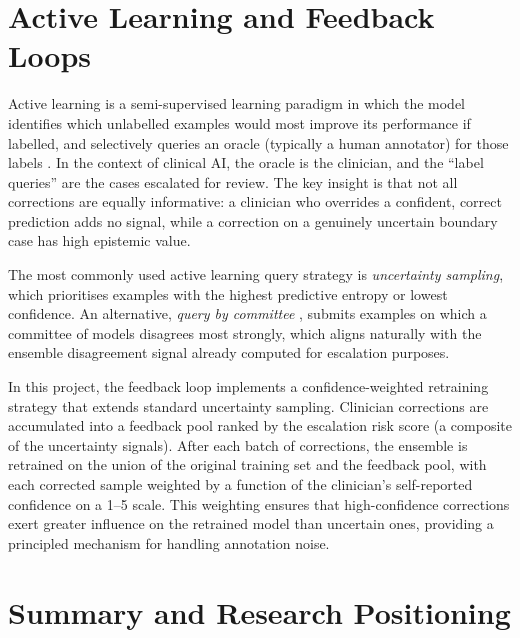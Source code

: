 \documentclass[12pt, a4paper]{report}
\begin{document}
  \section{Active Learning and Feedback Loops}
  \label{sec:active-learning}

  Active learning is a semi-supervised learning paradigm in which the model identifies
  which unlabelled examples would most improve its performance if labelled, and
  selectively queries an oracle (typically a human annotator) for those labels
  \citep{settles2009active}. In the context of clinical AI, the oracle is the
  clinician, and the ``label queries'' are the cases escalated for review. The key
  insight is that not all corrections are equally informative: a clinician who
  overrides a confident, correct prediction adds no signal, while a correction on a
  genuinely uncertain boundary case has high epistemic value.

  The most commonly used active learning query strategy is \emph{uncertainty
  sampling}, which prioritises examples with the highest predictive entropy or lowest
  confidence. An alternative, \emph{query by committee} \citep{settles2009active},
  submits examples on which a committee of models disagrees most strongly, which
  aligns naturally with the ensemble disagreement signal already computed for
  escalation purposes.

  In this project, the feedback loop implements a confidence-weighted retraining
  strategy that extends standard uncertainty sampling. Clinician corrections are
  accumulated into a feedback pool ranked by the escalation risk score (a composite
  of the uncertainty signals). After each batch of corrections, the ensemble is
  retrained on the union of the original training set and the feedback pool, with
  each corrected sample weighted by a function of the clinician's self-reported
  confidence on a 1--5 scale. This weighting ensures that high-confidence corrections
  exert greater influence on the retrained model than uncertain ones, providing a
  principled mechanism for handling annotation noise.

  \section{Summary and Research Positioning}
  \label{sec:positioning}
\end{document}
